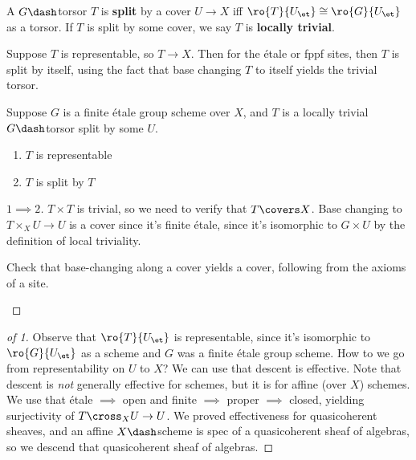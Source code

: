 \begin{definition}[?]

A \(G\dash\)torsor \(T\) is \textbf{split} by a cover \(U\to X\) iff
\(\ro{T}{U_\et} \cong \ro{G}{U_\et}\) as a torsor. If \(T\) is split by
some cover, we say \(T\) is \textbf{locally trivial}.

\end{definition}

\begin{remark}

Suppose \(T\) is representable, so \(T\to X\). Then for the étale or
fppf sites, then \(T\) is split by itself, using the fact that base
changing \(T\) to itself yields the trivial torsor.

\end{remark}

\begin{example}[?]

Suppose \(G\) is a finite étale group scheme over \(X\), and \(T\) is a
locally trivial \(G\dash\)torsor split by some \(U\).

\begin{claim}

\envlist

\begin{enumerate}
\def\labelenumi{\arabic{enumi}.}
\item
  \(T\) is representable
\item
  \(T\) is split by \(T\)
\end{enumerate}

\end{claim}

\begin{proof}[$1\implies 2$]

\(T\times T\) is trivial, so we need to verify that \(T \covers X\).
Base changing to \(T\times_X U \to U\) is a cover since it's finite
étale, since it's isomorphic to \(G\times U\) by the definition of local
triviality.

\begin{exercise}[?]

Check that base-changing along a cover yields a cover, following from
the axioms of a site.

\end{exercise}

\end{proof}

\begin{proof}[of 1]

Observe that \(\ro{T}{U_\et}\) is representable, since it's isomorphic
to \(\ro{G}{U_\et}\) as a scheme and \(G\) was a finite étale group
scheme. How to we go from representability on \(U\) to \(X\)? We can use
that descent is effective. Note that descent is \emph{not} generally
effective for schemes, but it is for affine (over \(X\)) schemes. We use
that étale \(\implies\) open and finite \(\implies\) proper \(\implies\)
closed, yielding surjectivity of \(T\cross_X U \to U\). We proved
effectiveness for quasicoherent sheaves, and an affine \(X\dash\)scheme
is spec of a quasicoherent sheaf of algebras, so we descend that
quasicoherent sheaf of algebras.


\end{proof}
\end{example}
